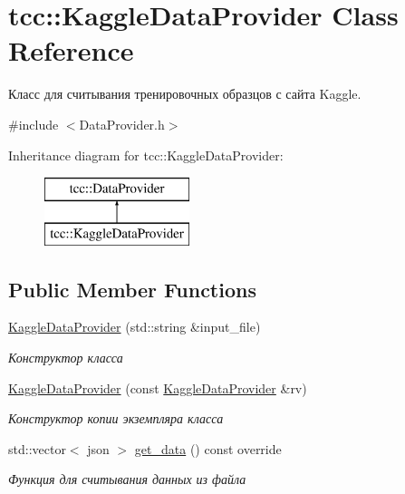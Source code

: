 \hypertarget{classtcc_1_1_kaggle_data_provider}{}\section{tcc\+:\+:Kaggle\+Data\+Provider Class Reference}
\label{classtcc_1_1_kaggle_data_provider}


Класс для считывания тренировочных образцов с сайта Kaggle.  




{\ttfamily \#include $<$Data\+Provider.\+h$>$}

Inheritance diagram for tcc\+:\+:Kaggle\+Data\+Provider\+:\begin{figure}[H]
\begin{center}
\leavevmode
\includegraphics[height=2.000000cm]{classtcc_1_1_kaggle_data_provider}
\end{center}
\end{figure}
\subsection*{Public Member Functions}
\begin{DoxyCompactItemize}
\item 
\hyperlink{classtcc_1_1_kaggle_data_provider_aac9b42f0803107edf1b3d66cc143f862}{Kaggle\+Data\+Provider} (std\+::string \&input\+\_\+file)
\begin{DoxyCompactList}\small\item\em Конструктор класса \end{DoxyCompactList}\item 
\hyperlink{classtcc_1_1_kaggle_data_provider_af650fc5c99e7fd507f48ec057fd34d21}{Kaggle\+Data\+Provider} (const \hyperlink{classtcc_1_1_kaggle_data_provider}{Kaggle\+Data\+Provider} \&rv)
\begin{DoxyCompactList}\small\item\em Конструктор копии экземпляра класса \end{DoxyCompactList}\item 
std\+::vector$<$ json $>$ \hyperlink{classtcc_1_1_kaggle_data_provider_a9a70415967019e9199957bf208a31478}{get\+\_\+data} () const  override
\begin{DoxyCompactList}\small\item\em Функция для считывания данных из файла \end{DoxyCompactList}\end{DoxyCompactItemize}


